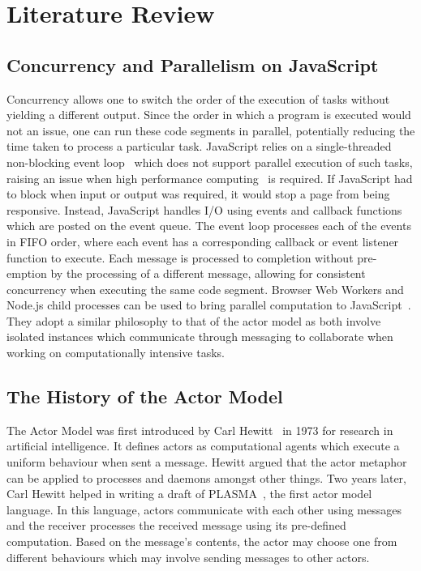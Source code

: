 \documentclass[lettersize,journal]{IEEEtran}
\begin{document}
\section{Literature Review}
\subsection{Concurrency and Parallelism on JavaScript}
Concurrency allows one to switch the order of the execution of tasks without yielding a different output. Since the order in which a program is executed would not an issue, one can run these code segments in parallel, potentially reducing the time taken to process a particular task. JavaScript relies on a single-threaded non-blocking event loop~\cite{eventloopbrowser}\cite{eventloopnode} which does not support parallel execution of such tasks, raising an issue when high performance computing~\cite{highperformance} is required. If JavaScript had to block when input or output was required, it would stop a page from being responsive. Instead, JavaScript handles I/O using events and callback functions which are posted on the event queue. The event loop processes each of the events in FIFO order, where each event has a corresponding callback or event listener function to execute. Each message is processed to completion without pre-emption by the processing of a different message, allowing for consistent concurrency when executing the same code segment. Browser Web Workers\cite{webworkers} and Node.js child processes\cite{cluster} can be used to bring parallel computation to JavaScript~\cite{concurrencyjs}\cite{spidersjs}. They adopt a similar philosophy to that of the actor model as both involve isolated instances which communicate through messaging to collaborate when working on computationally intensive tasks.

\subsection{The History of the Actor Model}
The Actor Model was first introduced by Carl Hewitt~\cite{hewitt1973session}\cite{43years} in 1973 for research in artificial intelligence. It defines actors as computational agents which execute a uniform behaviour when sent a message. Hewitt argued that the actor metaphor can be applied to processes and daemons amongst other things. Two years later, Carl Hewitt helped in writing a draft of PLASMA~\cite{plasma}\cite{chewitthowto}, the first actor model language. In this language, actors communicate with each other using messages and the receiver processes the received message using its pre-defined computation. Based on the message's contents, the actor may choose one from different behaviours which may involve sending messages to other actors.
\end{document}
